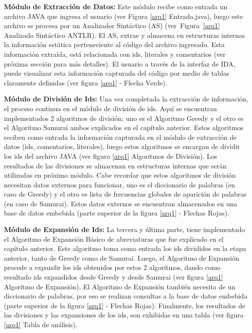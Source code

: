 \textbf{Módulo de Extracción de Datos:} Este módulo recibe como entrada un archivo JAVA que ingresa el usuario (ver Figura \ref{arq1} Entrada.java), luego este archivo se procesa por un Analizador Sintáctico (AS) (\mbox{ver Figura \ref{arq1}} Analizado Sintáctico ANTLR). El AS, extrae y almacena en estructuras internas la información estática perteneciente al código del archivo ingresado. Esta información extraída, está relacionada con ids, literales y comentarios (ver próxima sección para más detalles). El usuario a través de la interfaz de IDA, puede visualizar esta información capturada del código por medio de tablas claramente definidas (ver figura \ref{arq1} - Flecha Verde).

\textbf{Módulo de División de Ids:} Una vez completada la extracción de información, el proceso continua en el módulo de división de ids. Aquí se encuentran implementados 2 algoritmos de división; uno es el Algoritmo Greedy y el otro es el Algoritmo Samurai ambos explicados en el capítulo anterior. Estos algoritmos reciben como entrada la información capturada en el módulo de extracción de datos (ids, comentarios, literales), luego estos algoritmos se encargan de dividir los ids del archivo JAVA (ver figura \ref{arq1} Algoritmos de División). Los resultados de las divisiones se almacenan en estructuras internas que serán utilizadas en próximo módulo. Cabe recordar que estos algoritmos de división necesitan datos externos para funcionar, uno es el diccionario de palabras (en caso de Greedy) y el otro es lista de frecuencias globales de aparición de palabras (en caso de Samurai). Estos datos externos se encuentran almacenados en una base de datos embebida (parte superior de la figura \ref{arq1} - Flechas Rojas).

\textbf{Módulo de Expansión de Ids:} La tercera y última parte, tiene implementado el Algoritmo de Expansión Básico de abreviaturas que fue explicado en el capítulo anterior. Este algoritmo toma como entrada los ids divididos en la etapa anterior, tanto de Greedy como de Samurai. Luego, el Algoritmo de Expansión procede a expandir los ids obtenidos por estos 2 algoritmos, dando como resultado ids expandidos desde Greedy y desde Samurai (ver figura \ref{arq1} Algoritmo de Expansión). 
El \mbox{Algoritmo} de Expansión también necesita de un diccionario de palabras, por eso se realizan consultas a la base de datos embebida (parte superior de la figura \ref{arq1} - Flechas Rojas). Finalmente, los resultados de las divisiones y las expansiones de los ids, son exhibidas en una tabla (ver figura \ref{arq1} Tabla de análisis).

